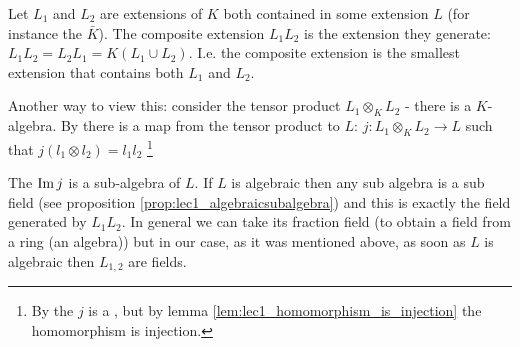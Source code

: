 \begin{definition}
  Let $L_1$ and $L_2$ are extensions of $K$ both contained in some
  extension $L$ (for instance the 
  $\bar{K}$). The composite extension $L_1 L_2$ is the extension they
  generate: $L_1 L_2 = L_2 L_1 = K\left(L_1 \cup L_2\right)$. I.e. the
  composite extension is the smallest extension that contains both
  $L_1$ and $L_2$.
  \label{def:compositeextension}
\end{definition}

Another way to view this: consider the tensor product $L_1 \otimes_K
L_2$ - there is a $K$-algebra. By 
there is a map from the tensor product to $L$:
\(
j: L_1 \otimes_K L_2 \to L  
\)
such that $j\left(l_1 \otimes l_2\right) = l_1 l_2$
\footnote{
  By the  $j$ is a 
  , but by lemma
  \ref{lem:lec1_homomorphism_is_injection} the homomorphism is
  injection.
}


The 
 $\operatorname{Im} j$ is a sub-algebra of $L$. If $L$ is
algebraic then any sub algebra is a sub field (see proposition
\ref{prop:lec1_algebraicsubalgebra}) and this 
is exactly the field generated by $L_1 L_2$. In general we can take
its fraction field (to obtain a field from a ring (an algebra)) but in
our case, as it was mentioned above, as soon as $L$ is algebraic then
$L_{1,2}$ are fields.

